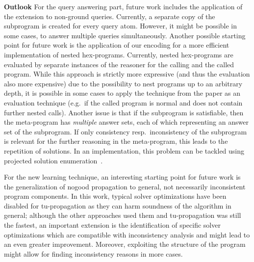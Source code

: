 \documentclass[11pt,fleqn,twoside]{article}
\newif\ifinlineref\inlinereffalse
\newcommand{\leanparagraph}[1]{\smallskip\noindent\textbf{#1}}
\newcommand\hex{{\sc hex}\xspace}
\begin{document}
		\leanparagraph{Outlook}
		For the query answering part, future work includes the application of the extension to non-ground queries.
		Currently, a separate copy of the subprogram is created for every query atom. However, it might be possible in some cases, to answer multiple queries simultaneously.
		Another possible starting point for future work is the application of our encoding for a more efficient implementation of nested \hex-programs.
		Currently, nested \hex-programs are evaluated by separate instances of the reasoner for the calling and the called program. While this approach is strictly more expressive (and thus the evaluation also more expensive)
		due to the possibility to nest programs up to an arbitrary depth, it is possible in some cases to apply the technique from the paper as an evaluation technique (e.g.~if the called program is normal and does not contain further nested calls).
		Another issue is that if the subprogram is satisfiable, then the meta-program has \emph{multiple} answer sets, each of which representing an answer set of the subprogram.
		If only consistency resp.~inconsistency of the subprogram is relevant for the further reasoning in the meta-program, this leads to the repetition of solutions.
		In an implementation, this problem can be tackled using projected solution enumeration~\cite{DBLP:conf/cpaior/GebserKS09}.
		
		For the new learning technique, an interesting starting point for future work is the generalization of nogood propagation to general,
		not necessarily inconsistent program components.
		In this work, typical solver optimizations have been disabled for tu-propagation as they can harm soundness of the algorithm in general;
		although the other approaches used them and tu-propagation was still the fastest,
		an important extension is the identification of specific solver optimizations which are
		compatible with inconsistency analysis and might lead to an even greater improvement.
		Moreover, exploiting the structure of the program might allow for finding inconsistency reasons in more cases.

	\ifinlineref
		
	\else
		
		
	\fi

	
\end{document}
